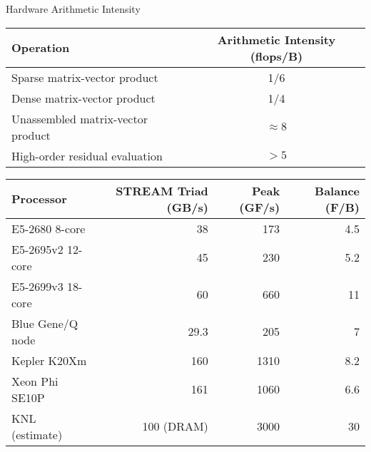 \begin{frame}{Hardware Arithmetic Intensity}
  \begin{tabular}{lc}
    \toprule
    Operation                         & Arithmetic Intensity (flops/B) \\
    \midrule
    Sparse matrix-vector product      & 1/6                  \\
    Dense matrix-vector product       & 1/4                  \\
    Unassembled matrix-vector product & $\approx 8$          \\
    High-order residual evaluation    & $> 5$                \\
    \bottomrule
  \end{tabular}

  \bigskip

  \begin{tabular}{lrrr}
    \toprule
    Processor & STREAM Triad (GB/s) & Peak (GF/s) & Balance (F/B) \\
    \midrule
    E5-2680 8-core      & 38   & 173  & 4.5 \\ %
    E5-2695v2 12-core & 45 & 230 & 5.2 \\ %
    E5-2699v3 18-core & 60 & 660 & 11 \\
    Blue Gene/Q node    & 29.3   & 205  & 7 \\ %
    Kepler K20Xm        & 160 & 1310 & 8.2 \\ %
    Xeon Phi SE10P      & 161 & 1060 & 6.6 \\ %
    \midrule
    KNL (estimate) & 100 (DRAM) & 3000 & 30 \\
    \bottomrule
  \end{tabular}
\end{frame}
